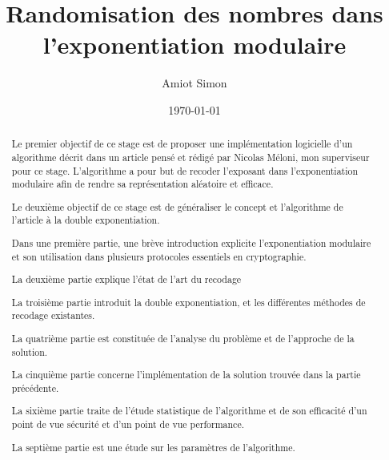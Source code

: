 \documentclass[12pt, a4paper]{memoir}
\title{ Randomisation des nombres dans l'exponentiation modulaire }%
\author{Amiot Simon}
\date{ \today} %
\begin{document}
\frontmatter\begin{titlingpage}\maketitle\end{titlingpage}

\newtheorem{Construction}{Construction de $D_{max}$}
\newtheorem{Propriété}{Propriété}
\newtheorem{Remarque}{Remarque}
\newtheorem{Preuve}{Preuve}
\newtheorem{Proposition}{Proposition}
\newtheorem{Corollaire}{Corollaire}
\newtheorem{Exemple}{Exemple}
\newtheorem{Definition}{Definition}

\abstractintoc
\begin{abstract} 
Le premier objectif de ce stage est de proposer une implémentation logicielle d'un algorithme décrit dans un article
pensé et rédigé par Nicolas Méloni, mon superviseur pour ce stage. L'algorithme a pour but de recoder l'exposant
dans l'exponentiation modulaire afin de rendre sa représentation aléatoire et efficace.

Le deuxième objectif de ce stage est de généraliser le concept et l'algorithme de l'article à la double exponentiation.

\end{abstract}
\abstractintoc
\renewcommand\abstractname{R\'esum\'e}
\begin{abstract}
Dans une première partie, une brève introduction explicite l'exponentiation modulaire et son utilisation dans plusieurs 
protocoles essentiels en cryptographie.

La deuxième partie explique l'état de l'art du recodage 

La troisième partie introduit la double exponentiation, et les différentes méthodes de recodage existantes.

La quatrième partie est constituée de l'analyse du problème et de l'approche de la solution.

La cinquième partie concerne l'implémentation de la solution trouvée dans la partie précédente.

La sixième partie traite de l'étude statistique de l'algorithme et de son efficacité d'un point de vue sécurité
et d'un point de vue performance.

La septième partie est une étude sur les paramètres de l'algorithme.

\end{abstract}
\end{document}
